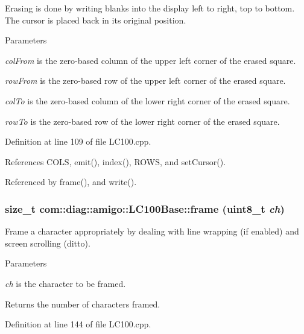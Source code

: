 Erasing is done by writing blanks into the display left to right, top to bottom. The cursor is placed back in its original position. 
\begin{DoxyParams}{Parameters}
\item[{\em colFrom}]is the zero-\/based column of the upper left corner of the erased square. \item[{\em rowFrom}]is the zero-\/based row of the upper left corner of the erased square. \item[{\em colTo}]is the zero-\/based column of the lower right corner of the erased square. \item[{\em rowTo}]is the zero-\/based row of the lower right corner of the erased square. \end{DoxyParams}


Definition at line 109 of file LC100.cpp.



References COLS, emit(), index(), ROWS, and setCursor().



Referenced by frame(), and write().

\hypertarget{classcom_1_1diag_1_1amigo_1_1LC100Base_ae97773781b9decc7a4f6f08eb6ec5162}{
\subsubsection[{frame}]{\setlength{\rightskip}{0pt plus 5cm}size\_\-t com::diag::amigo::LC100Base::frame (uint8\_\-t {\em ch})}}
\label{classcom_1_1diag_1_1amigo_1_1LC100Base_ae97773781b9decc7a4f6f08eb6ec5162}


Frame a character appropriately by dealing with line wrapping (if enabled) and screen scrolling (ditto). 


\begin{DoxyParams}{Parameters}
\item[{\em ch}]is the character to be framed. \end{DoxyParams}
\begin{DoxyReturn}{Returns}
the number of characters framed. 
\end{DoxyReturn}


Definition at line 144 of file LC100.cpp.



